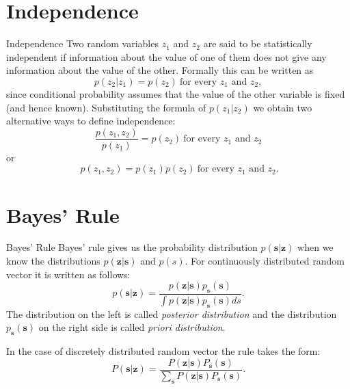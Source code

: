 \documentclass{beamer}
\begin{document}
\section{Independence}

\begin{frame}{Independence}
  Two random variables $z_1$ and $z_2$ are said to be statistically independent
  if information about the value of one of them does not give any information
  about the value of the other. Formally this can be written as
  \[
  p(z_2|z_1) = p(z_2) \ \text{for every $z_1$ and $z_2$},
  \]
  since conditional probability assumes that the value of the other variable is
  fixed (and hence known). Substituting the formula of $p(z_1|z_2)$ we obtain
  two alternative ways to define independence:
  \[
  \frac{p(z_1, z_2)}{p(z_1)} = p(z_2)  \ \text{for every $z_1$ and $z_2$}
  \]
  or
  \[
  \ p(z_1, z_2) = p(z_1)p(z_2)  \ \text{for every $z_1$ and $z_2$}.
  \]
\end{frame}

%
%

\section{Bayes' Rule}

\begin{frame}{Bayes' Rule}
  Bayes' rule gives us the probability distribution $p(\mathbf{s}|\mathbf{z})$
  when we know the distributions $p(\mathbf{z}|\mathbf{s})$ and $p(s)$. For
  continuously distributed random vector it is written as follows:
  \[
  p(\mathbf{s}|\mathbf{z}) =
  \frac{p(\mathbf{z}|\mathbf{s})p_{\mathbf{s}}(\mathbf{s})}{\int p(\mathbf{z}|\mathbf{s})p_{\mathbf{s}}(\mathbf{s})ds}.
  \]
  The distribution on the left is called \emph{posterior distribution} and the
  distribution $p_{\mathbf{s}}(\mathbf{s})$ on the right side is called
  \emph{priori distribution}.

  In the case of discretely distributed random vector the rule takes the form:
  \[
  P(\mathbf{s}|\mathbf{z}) =
  \frac{P(\mathbf{z}|\mathbf{s})P_{\mathbf{s}}(\mathbf{s})}{\sum_{\mathbf{s}} P(\mathbf{z}|\mathbf{s})P_{\mathbf{s}}(\mathbf{s})}.
  \]
\end{frame}
\end{document}
